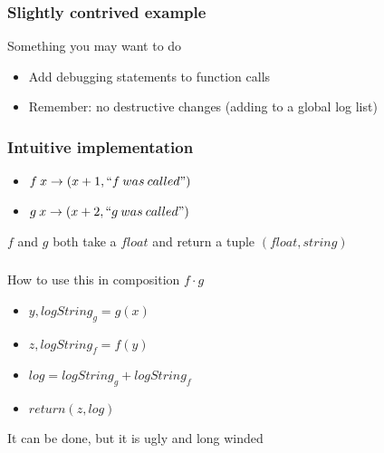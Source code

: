 \begin{frame}
    \frametitle{Slightly contrived example}
    \begin{block}{Something you may want to do}
        \begin{itemize}
            \item Add debugging statements to function calls
            \item Remember: no destructive changes (adding to a global log list)
        \end{itemize}
    \end{block}
\end{frame}

\begin{frame}[fragile]
    \frametitle{Intuitive implementation}
    \begin{block}{}
        \begin{itemize}
            \item $f \: x \rightarrow (x+1, ``f \: was \: called")$
            \item $g \: x \rightarrow (x+2, ``g \: was \: called")$
        \end{itemize}
    \end{block}
    \begin{block}{}
        $f$ and $g$ both take a $float$ and return a tuple $(float, string)$
    \end{block}
\end{frame}

\begin{frame}[fragile]
    
\end{frame}

\begin{frame}[fragile]
    \frametitle{}
    \begin{block}{How to use this in composition $f \cdot g$}
        \begin{itemize}
            \item $y, logString_g = g(x)$
            \item $z, logString_f = f(y)$
            \item $log = logString_g + logString_f$
            \item $return (z, log)$
        \end{itemize}
    \end{block}
    \begin{block}{}
        It can be done, but it is ugly and long winded
    \end{block}
\end{frame}

